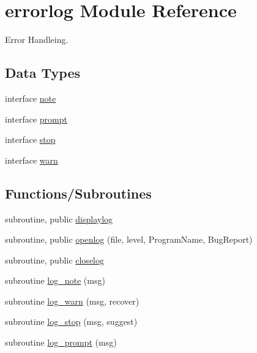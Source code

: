 \hypertarget{namespaceerrorlog}{}\section{errorlog Module Reference}
\label{namespaceerrorlog}


Error Handleing.  


\subsection*{Data Types}
\begin{DoxyCompactItemize}
\item 
interface \hyperlink{interfaceerrorlog_1_1note}{note}
\item 
interface \hyperlink{interfaceerrorlog_1_1prompt}{prompt}
\item 
interface \hyperlink{interfaceerrorlog_1_1stop}{stop}
\item 
interface \hyperlink{interfaceerrorlog_1_1warn}{warn}
\end{DoxyCompactItemize}
\subsection*{Functions/\+Subroutines}
\begin{DoxyCompactItemize}
\item 
subroutine, public \hyperlink{namespaceerrorlog_a05d233f410ba88bf3e2929528b1bb91e}{displaylog}
\item 
subroutine, public \hyperlink{namespaceerrorlog_a32bbf87dd265de25bd10ea31d95b751d}{openlog} (file, level, Program\+Name, Bug\+Report)
\item 
subroutine, public \hyperlink{namespaceerrorlog_af9219c790b58905faca7f5695515325d}{closelog}
\item 
subroutine \hyperlink{namespaceerrorlog_abcaf87ab55e0634007cc7177aa53469c}{log\+\_\+note} (msg)
\item 
subroutine \hyperlink{namespaceerrorlog_ac0a3d2c2bcdb3af8e91b4a27d2ac5ac0}{log\+\_\+warn} (msg, recover)
\item 
subroutine \hyperlink{namespaceerrorlog_afe1872ea4ca114ccb25faaa2f2d60e2e}{log\+\_\+stop} (msg, suggest)
\item 
subroutine \hyperlink{namespaceerrorlog_ac6531d63b5a5d4939c3d510dd7fbbb25}{log\+\_\+prompt} (msg)
\end{DoxyCompactItemize}
